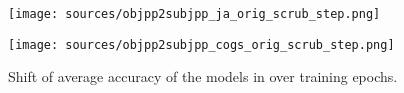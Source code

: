 \begin{figure}[t]
    \centering
    \begin{minipage}[b]{0.7\linewidth}
    \centering
    \texttt{[image: sources/objpp2subjpp\_ja\_orig\_scrub\_step.png]}
    \end{minipage}
    \begin{minipage}[b]{0.7\linewidth}
    \centering
    \texttt{[image: sources/objpp2subjpp\_cogs\_orig\_scrub\_step.png]}
    \end{minipage}
    \caption{Shift of average accuracy of the models in \dobjppsubjpp{} over training epochs.}
    \label{fig:results_overall_epoch_other}
\end{figure}